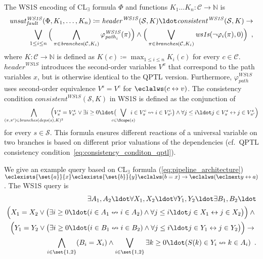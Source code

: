 \documentclass{LMCS}
\newcommand{\deps}{\mathit{deps}}
\newcommand{\branches}{\mathit{branches}}
\newcommand{\header}{\mathit{header}}
\newcommand{\consistent}{\mathit{consistent}}
\newcommand{\unsatnf}{\mathit{unsat}_\mathit{fault}}
\newcommand{\wsostransformer}{\mathit{ws1s}}
\theoremstyle{plain}\newtheorem{theorem}[thm]{Theorem}
\theoremstyle{plain}\newtheorem{lemma}[thm]{Lemma}
\theoremstyle{plain}\newtheorem{proposition}[thm]{Proposition}
\theoremstyle{plain}\newtheorem{corollary}[thm]{Corollary}
\theoremstyle{definition}\newtheorem{definition}{Definition}[section]
\begin{document}
\noindent
The WS1S encoding of CL$_\exists$ formula $\Phi$ and functions $K_1 \dots K_n : \mathcal{C} \rightarrow \mathbb{N}$ is
\begin{align} \label{eq:node_failure_transform_wsos}
  \unsatnf^\mathit{WS1S}(\Phi,K_1,\dots,K_n) \coloneqq
  \header^\mathit{WS1S}(\mathcal{S}, K) \ldot
  \consistent^\mathit{WS1S}(\mathcal{S},K) \rightarrow \nonumber \\
  \bigvee_{1 \leq i \leq n}
  \Big( \bigwedge_{\pi \in \branches(\mathcal{C},K_i)} \varphi_{\mathit{path}_i}^\mathit{WS1S}(\pi) \Big) \land
  \Big( \bigvee_{\pi \in \branches(\mathcal{C},K_i)} \wsostransformer(\neg\varphi_i(\pi),0) \Big) \enspace,
\end{align}
where $K : \mathcal{C} \rightarrow \mathbb{N}$ is defined as $K(c) \coloneqq \max_{1 \leq i \leq n} K_i(c)$ for every $c \in \mathcal{C}$.
$\header^\mathit{WS1S}$ introduces the second-order variables $V^x$ that correspond to the path variables $x$, but is otherwise identical to the QPTL version.
Furthermore, $\varphi_\mathit{path}^\mathit{WS1S}$ uses second-order equivalence $V^s = V^c$ for $\eclalws (c \leftrightarrow v)$.
The consistency condition $\consistent^\mathit{WS1S}(\mathcal{S}, K)$ in WS1S is defined as the conjunction of
\begin{equation*}
  \bigwedge_{(\pi,\pi') \in \branches(\deps(s),K)^2} \hspace{-24pt} \Big( V^s_\pi = V^s_{\pi'} \lor \exists i \geq 0 \ldot \big( \hspace{-10pt} \bigvee_{c \in \Scope(s)} \hspace{-10pt} i \in V^c_\pi \nleftrightarrow i \in V^c_{\pi'} \big) \land \forall j \leq i \ldot j \in V^s_\pi \leftrightarrow j \in V^s_{\pi'} \Big)
\end{equation*}
for every $s \in \mathcal{S}$.
This formula ensures different reactions of a universal variable on two branches is based on different prior valuations of the dependencies (cf.~QPTL consistency condition~\eqref{eq:consistency_conditon_qptl}).

We give an example query based on CL$_\exists$ formula (\ref{eq:pipeline_architecture}) $\eclexists{\set{a}}{x} \eclexists{\set{b}}{y} \eclalws (b = x) \rightarrow \eclalws (\eclnext y \leftrightarrow a)$.
The WS1S query is
\begin{align}
  \exists A_1, A_2 \ldot \forall X_1, X_2 \ldot \forall Y_1, Y_2 \ldot \exists B_1, B_2 \ldot \nonumber \\
  \Big( X_1 = X_2 \lor \big( \exists i \geq 0 \ldot (i \in A_1 \nleftrightarrow i \in A_2) \land \forall j \leq i \ldot j \in X_1 \leftrightarrow j \in X_2 \big) \Big) \land {} \nonumber \\
  \Big( Y_1 = Y_2 \lor \big( \exists i \geq 0 \ldot (i \in B_1 \nleftrightarrow i \in B_2) \land \forall j \leq i \ldot j \in Y_1 \leftrightarrow j \in Y_2 \big) \Big) \rightarrow {} \nonumber \\
  \bigwedge_{i \in \set{1,2}} (B_i = X_i) \land \bigvee_{i \in \set{1,2}} \exists k \geq 0 \ldot (S(k) \in Y_i \nleftrightarrow k \in A_i) \enspace.
\end{align}
\end{document}
